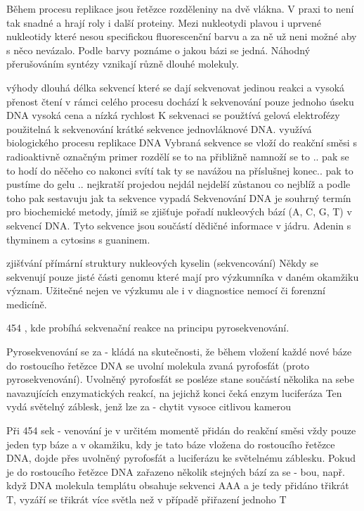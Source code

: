 \documentclass[czech,DP]{thesiskiv}
\begin{document}
Během procesu replikace jsou řetězce rozděleniny na dvě vlákna. 
V praxi to není tak snadné a hrají roly i další proteiny. 
Mezi nukleotydi plavou i uprvené nukleotidy které nesou specifickou fluorescenční barvu a za ně už neni možné aby s něco nevázalo.  Podle barvy poznáme o jakou bázi se jedná. 
Náhodný přerušováním syntézy vznikají různě dlouhé molekuly. 

výhody dlouhá délka sekvencí které se dají sekvenovat jedinou reakci a vysoká přenost čtení
v rámci celého procesu dochází k sekvenování pouze jednoho úseku DNA 
vysoká cena a nízká rychlost
 K sekvenaci se použtívá gelová elektrofézy
 použitelná k sekvenování krátké sekvence jednovláknové DNA. 
 využívá biologického procesu replikace DNA
 Vybraná sekvence se vloží do reakční směsi s radioaktivně označným primer
 rozdělí se to na přibližně 
 namnoží se to .. 
 pak se to hodí do něčeho co nakonci svítí tak ty se navážou na příslušnej konec.. 
 pak to pustíme do gelu .. 
 nejkratší projedou nejdál
 nejdelší zůstanou co nejblíž a podle toho pak sestavuju jak ta sekvence vypadá
Sekvenování DNA je souhrný termín pro biochemické metody, jímiž se zjišťuje pořadí nukleových bází (A, C, G, T) v sekvencí DNA. Tyto sekvence jsou součástí dědičné informace v jádru.
Adenin s thyminem a cytosins s guaninem.

zjišťvání přímární struktury nukleových kyselin (sekvencování)
Někdy se sekvenují pouze jisté části genomu které mají pro výzkumníka v daném okamžiku význam.
Užitečné nejen ve výzkumu ale i v diagnostice nemocí či forenzní medicíně. 


454 
, kde probíhá sekvenační reakce na principu pyrosekvenování.  

 Pyrosekvenování se za -
kládá na skutečnosti, že během vložení
každé nové báze do rostoucího řetězce
DNA se uvolní molekula zvaná pyrofosfát
(proto pyrosekvenování). Uvolněný pyrofosfát se posléze stane součástí několika
na sebe navazujících enzymatických reakcí, na jejichž konci čeká enzym luciferáza
Ten vydá světelný záblesk, jenž lze za -
chytit vysoce citlivou kamerou


 Při 454 sek -
venování je v určitém momentě přidán do
reakční směsi vždy pouze jeden typ báze
a v okamžiku, kdy je tato báze vložena do
rostoucího řetězce DNA, dojde přes uvolněný pyrofosfát a luciferázu ke světelnému
záblesku. Pokud je do rostoucího řetězce
DNA zařazeno několik stejných bází za se -
bou, např. když DNA molekula templátu
obsahuje sekvenci AAA a je tedy přidáno
třikrát T, vyzáří se třikrát více světla než
v případě přiřazení jednoho T
\end{document}
